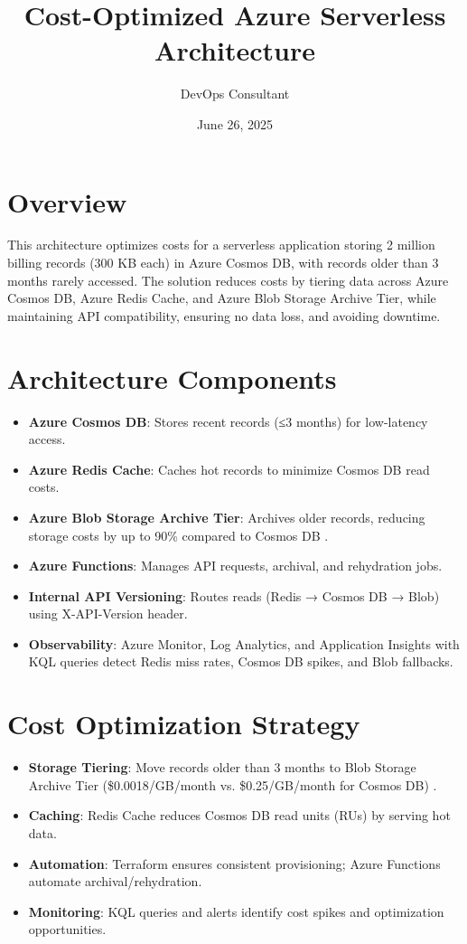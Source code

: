 \documentclass[a4paper]{article}
\title{Cost-Optimized Azure Serverless Architecture}
\author{DevOps Consultant}
\date{June 26, 2025}
\begin{document}
\maketitle

\section*{Overview}
This architecture optimizes costs for a serverless application storing 2 million billing records (300 KB each) in Azure Cosmos DB, with records older than 3 months rarely accessed. The solution reduces costs by tiering data across Azure Cosmos DB, Azure Redis Cache, and Azure Blob Storage Archive Tier, while maintaining API compatibility, ensuring no data loss, and avoiding downtime.

\section*{Architecture Components}
\begin{itemize}
    \item \textbf{Azure Cosmos DB}: Stores recent records (≤3 months) for low-latency access.
    \item \textbf{Azure Redis Cache}: Caches hot records to minimize Cosmos DB read costs.
    \item \textbf{Azure Blob Storage Archive Tier}: Archives older records, reducing storage costs by up to 90\% compared to Cosmos DB \cite{web20}.
    \item \textbf{Azure Functions}: Manages API requests, archival, and rehydration jobs.
    \item \textbf{Internal API Versioning}: Routes reads (Redis → Cosmos DB → Blob) using X-API-Version header.
    \item \textbf{Observability}: Azure Monitor, Log Analytics, and Application Insights with KQL queries detect Redis miss rates, Cosmos DB spikes, and Blob fallbacks.
\end{itemize}

\section*{Cost Optimization Strategy}
\begin{itemize}
    \item \textbf{Storage Tiering}: Move records older than 3 months to Blob Storage Archive Tier (\$0.0018/GB/month vs. \$0.25/GB/month for Cosmos DB) \cite{web15}.
    \item \textbf{Caching}: Redis Cache reduces Cosmos DB read units (RUs) by serving hot data.
    \item \textbf{Automation}: Terraform ensures consistent provisioning; Azure Functions automate archival/rehydration.
    \item \textbf{Monitoring}: KQL queries and alerts identify cost spikes and optimization opportunities.
\end{itemize}
\end{document}
